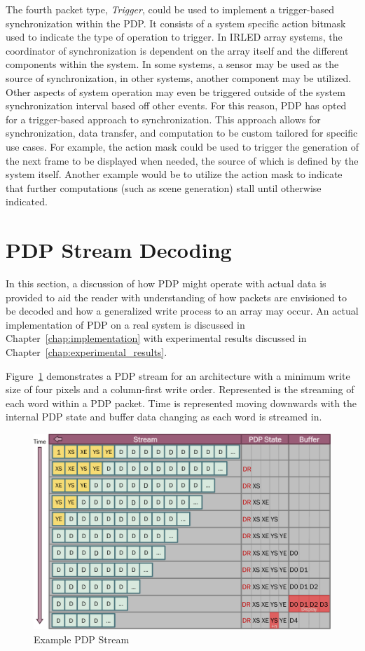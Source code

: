     The fourth packet type, {\it Trigger}, could be used to implement a trigger-based synchronization within the PDP. It consists of a system specific action bitmask used to indicate the type of operation to trigger. In IRLED array systems, the coordinator of synchronization is dependent on the array itself and the different components within the system. In some systems, a sensor may be used as the source of synchronization, in other systems, another component may be utilized. Other aspects of system operation may even be triggered outside of the system synchronization interval based off other events. For this reason, PDP has opted for a trigger-based approach to synchronization. This approach allows for synchronization, data transfer, and computation to be custom tailored for specific use cases. For example, the action mask could be used to trigger the generation of the next frame to be displayed when needed, the source of which is defined by the system itself. Another example would be to utilize the action mask to indicate that further computations (such as scene generation) stall until otherwise indicated.

\section{PDP Stream Decoding}
    \label{sec:pdp_stream_decoding}
    In this section, a discussion of how PDP might operate with actual data is provided to aid the reader with understanding of how packets are envisioned to be decoded and how a generalized write process to an array may occur. An actual implementation of PDP on a real system is discussed in Chapter~\ref{chap:implementation} with experimental results discussed in Chapter~\ref{chap:experimental_results}.

    Figure~\ref{fig:pdp_stream} demonstrates a PDP stream for an architecture with a minimum write size of four pixels and a column-first write order. Represented is the streaming of each word within a PDP packet. Time is represented moving downwards with the internal PDP state and buffer data changing as each word is streamed in.

    \begin{figure}
        \centering
        \includegraphics[width=1.0\textwidth]{fig/pdp_stream.pdf}
        \caption{Example PDP Stream}
        \label{fig:pdp_stream}
    \end{figure}

